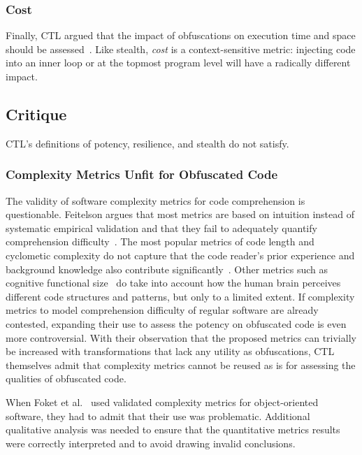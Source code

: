\subsubsection{Cost}
Finally, CTL argued that the impact of obfuscations on execution time and space should be assessed~\cite{collberg1997taxonomy}. Like stealth, \emph{cost} is a context-sensitive metric: injecting code into an inner loop or at the topmost program level will have a radically different impact. 

\subsection{Critique}
\label{sec:9798-critiques}
CTL's definitions of potency, resilience, and stealth do not satisfy. 

\subsubsection{Complexity Metrics Unfit for Obfuscated Code}
\label{sec:unfit_complexity_metrics}
The validity of software complexity metrics for code comprehension is questionable. Feitelson argues that most metrics are based on intuition instead of systematic empirical validation and that they fail to adequately quantify comprehension difficulty~\cite{feitelson}. The most popular metrics of code length and cyclometic complexity do not capture that the code reader's prior experience and background knowledge also contribute significantly~\cite{halstead,mccabe1976,code_metrics}. Other metrics such as cognitive functional size~\cite{cognitive_functional_size} do take into account how the human brain perceives different code structures and patterns, but only to a limited extent. If complexity metrics to model comprehension difficulty of regular software are already contested, expanding their use to assess the potency on obfuscated code is even more controversial. With their observation that the proposed metrics can trivially be increased with transformations that lack any utility as obfuscations, CTL themselves admit that complexity metrics cannot be reused as is for assessing the qualities of obfuscated code. 

When Foket et al.~\cite{Foket14} used validated complexity metrics for object-oriented software, they had to admit that their use was problematic. Additional qualitative analysis was needed to ensure that the quantitative metrics results were correctly interpreted and to avoid drawing invalid conclusions. 

